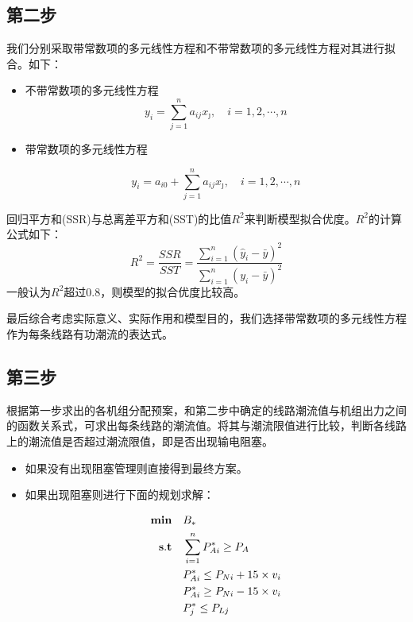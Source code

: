 \documentclass[12pt,a4paper]{ctexart}
\begin{document}
	
	\subsection{第二步}
	
	
	我们分别采取带常数项的多元线性方程和不带常数项的多元线性方程对其进行拟合。如下：
	
	\begin{itemize}
		\item {不带常数项的多元线性方程}
		\begin{equation} 
			y_{i}=\sum_{j=1}^{n} a_{i j} x_{\jmath}, \quad i=1,2, \cdots, n
		\end{equation}
		
		\item {带常数项的多元线性方程}
		
		
		\begin{equation} 
			y_{i}=a_{i 0}+\sum_{j=1}^{n} a_{i j} x_{\jmath}, \quad i=1,2, \cdots, n
		\end{equation}
	\end{itemize}
	
	
	回归平方和(SSR)与总离差平方和(SST)的比值$R^{2}$来判断模型拟合优度。$R^{2}$的计算公式如下：
	\begin{equation} 
		R^{2}=\frac{S S R}{S S T}=\frac{\sum_{i=1}^{n}\left(\hat{y}_{i}-\bar{y}\right)^{2}}{\sum_{i=1}^{n}\left(y_{i}-\bar{y}\right)^{2}}
	\end{equation}
	一般认为$R^{2}$超过0.8，则模型的拟合优度比较高。
	
	最后综合考虑实际意义、实际作用和模型目的，我们选择带常数项的多元线性方程作为每条线路有功潮流的表达式。
	
	\subsection{第三步}
	根据第一步求出的各机组分配预案，和第二步中确定的线路潮流值与机组出力之间的函数关系式，可求出每条线路的潮流值。将其与潮流限值进行比较，判断各线路上的潮流值是否超过潮流限值，即是否出现输电阻塞。
	
	\begin{itemize}
		\vspace{0.5em}
		\item 如果没有出现阻塞管理则直接得到最终方案。
		\vspace{0.5em}
		\item 如果出现阻塞则进行下面的规划求解：
		
		\begin{equation*}
			\begin{split}
				{\bf min}\quad & B_{*}\\
				{\bf s.t}\quad &\sum_{i=1}^{n}P_{Ai}^{*} \ge P_{A}\\
				&P_{Ai}^{*} \le P_{Ni} + 15\times v_{i} \\
				&P_{Ai}^{*} \ge P_{Ni} - 15\times v_{i} \\
				&P_{j}^{*} \le P_{Lj} \\
			\end{split}
		\end{equation*}
		
	\end{itemize}
\end{document}
